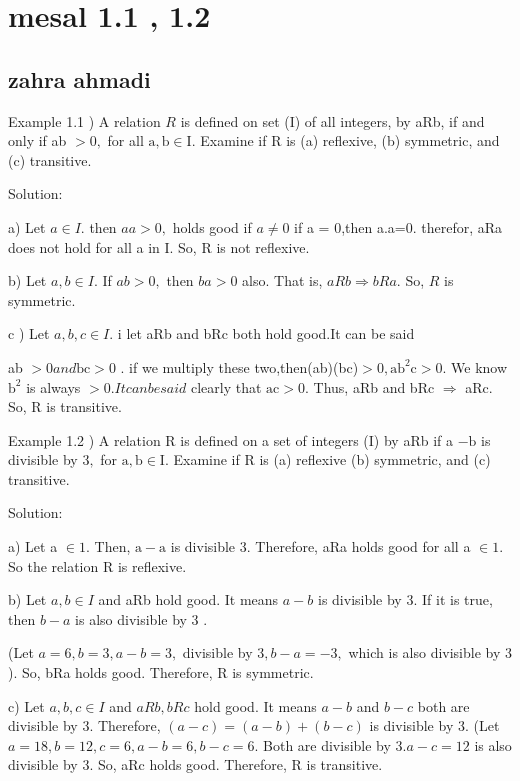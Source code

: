 \documentclass [12pt]{beamer}
\begin{document}
\section*{mesal 1.1 , 1.2 }
\subsection*{zahra ahmadi  }	
\begin{frame}
\justifying
Example 1.1 ) A relation $R$ is defined on set (I) of all integers, by aRb, if and only if ab $>0,$ for all $\mathrm{a}, \mathrm{b} \in \mathrm{I} .$ Examine if $\mathrm{R}$ is (a) reflexive, (b) symmetric, and (c) transitive.
\begin{flushleft}
Solution:
\end{flushleft}
a)  Let $a \in I$. then  $aa>0,$ holds good  if $ a\neq0$ if a = 0,then a.a=0.
therefor, aRa does not hold for all a in I. So, R is not reflexive.
\begin{flushleft}
b) Let $a, b \in I$. If $a b>0,$ then $b a>0$ also. That is, $a R b \Rightarrow b R a .$ So, $R$ is symmetric.
\end{flushleft}
c ) Let $a, b , c \in I$. i let aRb and bRc both hold good.It can be said 
\begin{flushleft}
ab $>0 and  $$\mathrm{bc}>0$  . if we  multiply these two,then(ab)(bc)$>0,\mathrm{ab}^{2} \mathrm{c}>0 .$ We know $\mathrm{b}^{2}$ is always $>0 .
It can be said $ clearly that $\mathrm{ac}>0$.
Thus, aRb and bRc $\Rightarrow$ aRc. So, R is transitive.
\end{flushleft}
\end{frame}
\begin{frame}	
\justifying
Example 1.2 ) A relation $\mathrm{R}$ is defined on a set of integers (I) by aRb if a $-\mathrm{b}$ is divisible by $3,$ for  $\mathrm{a}, \mathrm{b} \in \mathrm{I} .$ Examine if $\mathrm{R}$ is (a) reflexive (b) symmetric, and (c) transitive.
\begin{flushleft}
Solution:
\end{flushleft}

a) Let a $\in 1 .$ Then, $\mathrm{a}-\mathrm{a}$ is divisible $3 .$ Therefore, aRa holds good for all a $\in 1 .$ So the relation $\mathrm{R}$ is reflexive.
\begin{flushleft}
b) Let $a, b \in I$ and aRb hold good. It means $a-b$ is divisible by $3 .$ If it is true, then $b-a$ is also divisible by 3 .
\end{flushleft} 
\begin{flushleft}
(Let $a=6, b=3, a-b=3,$ divisible by $3, b-a=-3,$ which is also divisible by 3 ). So, bRa holds good. Therefore, $\mathrm{R}$ is symmetric.
\end{flushleft}
\begin{flushleft}
c) Let $a, b, c \in I$ and $a R b, b R c$ hold good. It means $a-b$ and $b-c$ both are divisible by $3 .$ Therefore, $(a-c)=(a-b)+(b-c)$ is divisible by 3.
(Let $a=18, b=12, c=6, a-b=6, b-c=6 .$ Both are divisible by $3 . a-c=12$ is also divisible by $3 .$ So, aRc holds good. Therefore, $\mathrm{R}$ is transitive.
\end{flushleft}
\end{frame}
\end{document}
